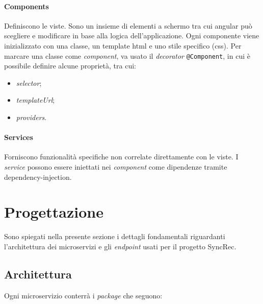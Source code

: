 \paragraph*{Components}
Definiscono le viste. Sono un insieme di elementi a schermo tra cui \gls{angular} può scegliere e modificare in base alla logica dell'applicazione.
Ogni componente viene inizializzato con una classe, un template \acrshort{html} e uno stile specifico (\acrshort{css}).
Per marcare una classe come \textit{component}, va usato il \textit{decorator} \texttt{@Component}, in cui è possibile definire alcune proprietà, tra cui:
\begin{itemize}
	\item \textit{selector};
	\item \textit{templateUrl};
	\item \textit{providers}.
\end{itemize}

\paragraph*{Services}
Forniscono funzionalità specifiche non correlate direttamente con le viste. I \textit{service} possono essere iniettati nei \textit{component} come dipendenze tramite \gls{dependency-injection}.


\section{Progettazione}\label{sec:progettazione}

Sono spiegati nella presente sezione i dettagli fondamentali riguardanti l'architettura dei microservizi e gli \textit{endpoint} usati per il progetto SyncRec.

\subsection{Architettura}
Ogni \gls{microservizio} conterrà i \textit{package} che seguono:

